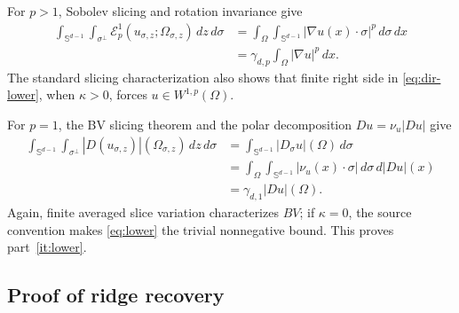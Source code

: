 \documentclass[11pt]{article}
\newcommand{\Sph}{\mathbb S}
\newcommand{\E}{\mathcal E}
\begin{document}
For $p>1$, Sobolev slicing and rotation invariance give
\begin{align*}
 \int_{\Sph^{d-1}}\int_{\sigma^\perp}
 \E_p^1(u_{\sigma,z};\Omega_{\sigma,z})\,dz\,d\sigma
 &=\int_\Omega\int_{\Sph^{d-1}}|\nabla u(x)\cdot\sigma|^p
 \,d\sigma\,dx\\
 &=\gamma_{d,p}\int_\Omega|\nabla u|^p\,dx.
\end{align*}
The standard slicing characterization also shows that finite right side in
\eqref{eq:dir-lower}, when $\kappa>0$, forces $u\in W^{1,p}(\Omega)$.

For $p=1$, the BV slicing theorem and the polar decomposition
$Du=\nu_u|Du|$ give \cite[Section 3.11]{AFP}
\begin{align*}
 \int_{\Sph^{d-1}}\int_{\sigma^\perp}
 |D(u_{\sigma,z})|(\Omega_{\sigma,z})\,dz\,d\sigma
 &=\int_{\Sph^{d-1}}|D_\sigma u|(\Omega)\,d\sigma\\
 &=\int_\Omega\int_{\Sph^{d-1}}|\nu_u(x)\cdot\sigma|
 \,d\sigma\,d|Du|(x)\\
 &=\gamma_{d,1}|Du|(\Omega).
\end{align*}
Again, finite averaged slice variation characterizes $BV$; if $\kappa=0$,
the source convention makes \eqref{eq:lower} the trivial nonnegative bound.
This proves part~\ref{it:lower}.

\subsection{Proof of ridge recovery}
\end{document}

